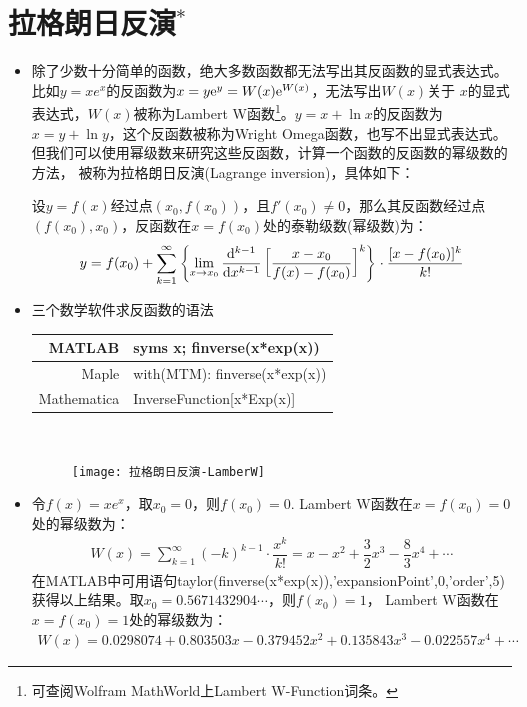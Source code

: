 \section{拉格朗日反演$ ^* $}
\begin{itemize}[leftmargin=\inteval{\myitemleftmargin}pt,itemsep=
   \inteval{\myitemitempsep}pt,topsep=\inteval{\myitemtopsep}pt]
\item 除了少数十分简单的函数，绝大多数函数都无法写出其反函数的显式表达式。
比如$ y=xe^x $的反函数为$ x=y\mathrm{e}^{y}=W(x)\mathrm{e}^{W(x)} $，无法写出$ W(x) $关于
$ x $的显式表达式，$ W(x) $被称为Lambert W函数\footnote{
可查阅Wolfram MathWorld上Lambert W-Function词条。}。$ y=x+\ln x $的反函数为
$ x=y+\ln y $，这个反函数被称为Wright Omega函数，也写不出显式表达式。
但我们可以使用幂级数来研究这些反函数，计算一个函数的反函数的幂级数的方法，
被称为拉格朗日反演(Lagrange inversion)，具体如下：

设$ y=f(x) $经过点$ (x_0,f(x_0)) $，且$ f'(x_0)\neq 0 $，那么其反函数经过点
$ (f(x_0),x_0) $，反函数在$ x=f(x_0) $处的泰勒级数(幂级数)为：
\begin{gather}\label{拉格朗日反演公式}
    y=f(x_0)+\sum_{k=1}^{\infty}\left\{\lim_{x\to x_0}\dfrac{\mathrm{d}^{k-1}}{\mathrm{d} x^{k-1}}
    \left[\dfrac{x-x_0}{f(x)-f(x_0)}\right]^k\right\}\cdot 
    \dfrac{[x-f(x_0)]^k}{k!}
\end{gather}

\item 三个数学软件求反函数的语法 
\begin{table}[!htbp]
\centering
\begin{tabular}{|r|l|}
    \hline
    MATLAB & syms x; finverse(x*exp(x)) \\ \hline
    Maple & with(MTM): finverse(x*exp(x)) \\ \hline
    Mathematica & InverseFunction[x*Exp(x)] \\ \hline
\end{tabular}
\end{table} \\

\begin{figure}[!htbp]
    \centering
    \texttt{[image: 拉格朗日反演-LamberW]}
\end{figure}

\item 令$ f(x)=xe^x $，取$ x_0=0 $，则$ f(x_0)=0 $.
Lambert W函数在$ x=f(x_0)=0 $处的幂级数为：
\begin{gather}\label{LambertW拉格朗日反演x=0}
    W(x)=\sum_{k=1}^{\infty}(-k)^{k-1}\cdot \dfrac{x^k}{k!}
    =x-x^2+\dfrac{3}{2}x^3-\dfrac{8}{3}x^4+\cdots 
\end{gather}
在MATLAB中可用语句taylor(finverse(x*exp(x)),'expansionPoint',0,'order',5)
获得以上结果。取$ x_0=0.5671432904\cdots $，则$ f(x_0)=1 $，
Lambert W函数在$ x=f(x_0)=1 $处的幂级数为：
\begin{gather}\label{LambertW拉格朗日反演x=1}
    W(x)=0.0298074 + 0.803503x - 0.379452x^2 + 0.135843x^3 - 0.022557x^4+\cdots
\end{gather}


\end{itemize}
